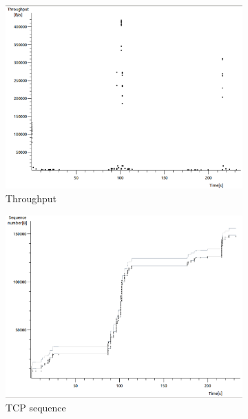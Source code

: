 \documentclass[conference,a4paper]{../../sty/IEEEtran}
\begin{document}
\begin{figure}
 \centering
 \begin{subfigure}[b]{0.2\textwidth}
  \includegraphics[width=\textwidth]{s8-2_th}
  \caption{Throughput}
 \end{subfigure}
 \begin{subfigure}[b]{0.2\textwidth}
  \includegraphics[width=\textwidth]{s8-2_seq}
  \caption{TCP sequence}
 \end{subfigure}
 \begin{subfigure}[b]{0.2\textwidth}

\end{subfigure}
\end{figure}
\end{document}
